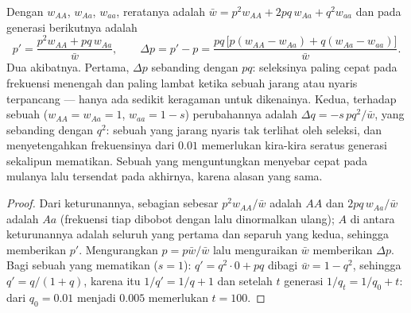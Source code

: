 \begin{theorem}\label{thm:b2:population-genetics:selection}
Dengan   $w_{AA}$, $w_{Aa}$, $w_{aa}$, 
reratanya adalah $\bar w = p^{2}w_{AA} + 2pq\,w_{Aa} + q^{2}w_{aa}$ dan
 pada generasi berikutnya adalah
\[
p' = \frac{p^{2}w_{AA} + pq\,w_{Aa}}{\bar w}, \qquad
\Delta p = p' - p = \frac{pq\,\bigl[p(w_{AA} - w_{Aa}) + q(w_{Aa} - w_{aa})\bigr]}{\bar w}.
\]
Dua akibatnya. Pertama, $\Delta p$ sebanding dengan $pq$: seleksinya
paling cepat pada frekuensi menengah dan paling lambat ketika sebuah
 jarang atau nyaris terpancang --- hanya ada sedikit keragaman
untuk dikenainya. Kedua, terhadap sebuah   ($w_{AA} = w_{Aa} = 1$, $w_{aa} =
1 - s$) perubahannya adalah $\Delta q = -s\,pq^{2}/\bar w$, yang sebanding dengan $q^{2}$: sebuah  
yang jarang nyaris tak terlihat oleh seleksi, dan menyetengahkan
frekuensinya dari $0.01$ memerlukan kira-kira seratus generasi
sekalipun  mematikan. Sebuah   yang
menguntungkan menyebar cepat pada mulanya lalu tersendat pada
akhirnya, karena alasan yang sama.
\end{theorem}
\begin{proof}
Dari keturunannya, sebagian sebesar $p^{2}w_{AA}/\bar w$ adalah $AA$
dan $2pq\,w_{Aa}/\bar w$ adalah $Aa$ (frekuensi tiap 
dibobot dengan  lalu dinormalkan ulang);  $A$ di antara
keturunannya adalah seluruh yang pertama dan separuh yang kedua,
sehingga memberikan $p'$. Mengurangkan $p =
p\bar w/\bar w$ lalu
menguraikan $\bar w$ memberikan $\Delta p$. Bagi sebuah  
yang mematikan ($s = 1$): $q' = q^{2}\cdot 0 + pq$ dibagi $\bar w = 1 -
q^{2}$, sehingga $q' = q/(1 + q)$, karena itu $1/q' = 1/q + 1$ dan
setelah $t$ generasi $1/q_t = 1/q_0 + t$: dari $q_0 = 0.01$ menjadi
$0.005$ memerlukan $t = 100$.
\end{proof}

